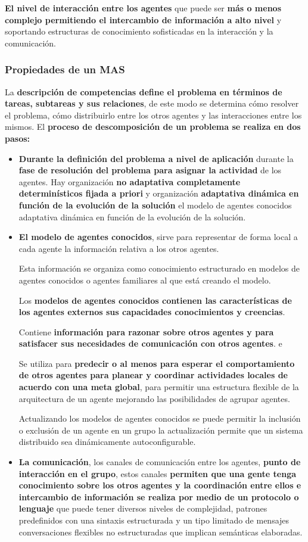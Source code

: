 \documentclass[12pt, twoside, openright]{report} %
\begin{document}
\textbf{El nivel de interacción entre los agentes} que puede ser \textbf{más o menos complejo permitiendo el intercambio de información a alto nivel} y soportando estructuras de conocimiento sofisticadas en la interacción y la comunicación.

\subsubsection{Propiedades de un MAS}
La \textbf{descripción de competencias define el problema en términos de tareas, subtareas y sus relaciones}, de este modo se determina cómo resolver el problema, cómo distribuirlo entre los otros agentes y las interacciones entre los mismos. El \textbf{proceso de descomposición de un problema se realiza en dos pasos:}
\begin{itemize}
	\item \textbf{Durante la definición del problema a nivel de aplicación} durante la \textbf{fase de resolución del problema para asignar la actividad} de los agentes. Hay organización \textbf{no adaptativa completamente determinísticos fijada a priori} y organización \textbf{adaptativa dinámica en función de la evolución de la solución} el modelo de agentes conocidos adaptativa dinámica en función de la evolución de la solución.
	\item \textbf{El modelo de agentes conocidos}, sirve para representar de forma local a cada agente la información relativa a los otros agentes. 
	
	Esta información se organiza como conocimiento estructurado en modelos de agentes conocidos o agentes familiares al que está creando el modelo. 
	
	Los \textbf{modelos de agentes conocidos contienen las características de los agentes externos sus capacidades conocimientos y creencias}. 
	
	Contiene \textbf{información para razonar sobre otros agentes y para satisfacer sus necesidades de comunicación con otros agentes}. e
	
	Se utiliza para \textbf{predecir o al menos para esperar el comportamiento de otros agentes para planear y coordinar actividades locales de acuerdo con una meta global}, para permitir una estructura flexible de la arquitectura de un agente mejorando las posibilidades de agrupar agentes.
	
	Actualizando los modelos de agentes conocidos se puede permitir la inclusión o exclusión de un agente en un grupo la actualización permite que un sistema distribuido sea dinámicamente autoconfigurable.
	\item \textbf{La comunicación}, los canales de comunicación entre los agentes, \textbf{punto de interacción en el grupo}, estos canales \textbf{permiten que una gente tenga conocimiento sobre los otros agentes y la coordinación entre ellos e intercambio de información se realiza por medio de un protocolo o lenguaje} que puede tener diversos niveles de complejidad, patrones predefinidos con una sintaxis estructurada y un tipo limitado de mensajes conversaciones flexibles no estructuradas que implican semánticas elaboradas. 
	

\end{itemize}
\end{document}
